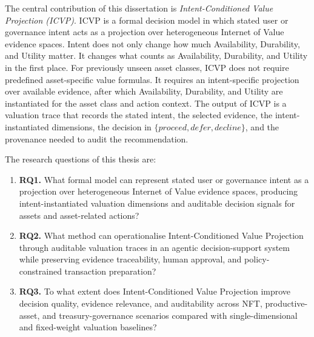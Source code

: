 The central contribution of this dissertation is \emph{Intent-Conditioned Value Projection (ICVP)}. ICVP is a formal decision model in which stated user or governance intent acts as a projection over heterogeneous Internet of Value evidence spaces. Intent does not only change how much Availability, Durability, and Utility matter. It changes what counts as Availability, Durability, and Utility in the first place. For previously unseen asset classes, ICVP does not require predefined asset-specific value formulas. It requires an intent-specific projection over available evidence, after which Availability, Durability, and Utility are instantiated for the asset class and action context. The output of ICVP is a valuation trace that records the stated intent, the selected evidence, the intent-instantiated dimensions, the decision in $\{\textit{proceed}, \textit{defer}, \textit{decline}\}$, and the provenance needed to audit the recommendation.

The research questions of this thesis are:

\begin{enumerate}
   \item \textbf{RQ1.} What formal model can represent stated user or governance intent as a projection over heterogeneous Internet of Value evidence spaces, producing intent-instantiated valuation dimensions and auditable decision signals for assets and asset-related actions?
   \item \textbf{RQ2.} What method can operationalise Intent-Conditioned Value Projection through auditable valuation traces in an agentic decision-support system while preserving evidence traceability, human approval, and policy-constrained transaction preparation?
   \item \textbf{RQ3.} To what extent does Intent-Conditioned Value Projection improve decision quality, evidence relevance, and auditability across NFT, productive-asset, and treasury-governance scenarios compared with single-dimensional and fixed-weight valuation baselines?
\end{enumerate}


